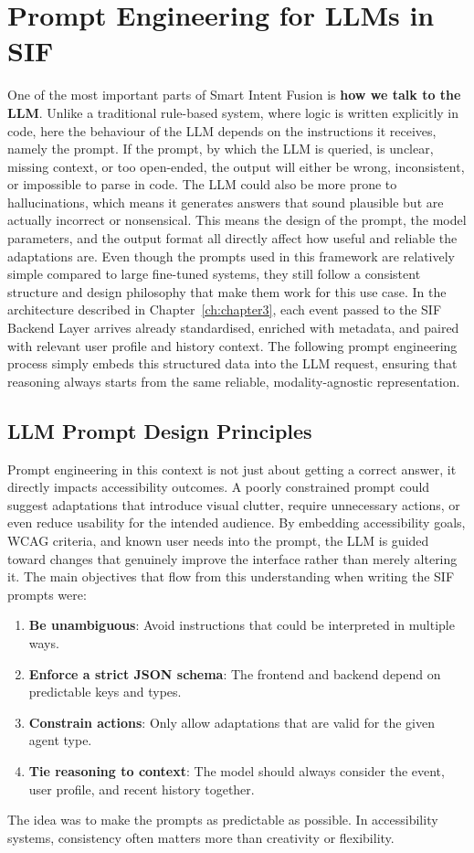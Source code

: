 \documentclass[openany]{book}
\begin{document}
\section{Prompt Engineering for LLMs in SIF}
One of the most important parts of Smart Intent Fusion is \textbf{how we talk to the LLM}.
Unlike a traditional rule-based system, where logic is written explicitly in code, here the behaviour of the LLM depends on the instructions it receives, namely the prompt.
If the prompt, by which the LLM is queried, is unclear, missing context, or too open-ended, the output will either be wrong, inconsistent, or impossible to parse in code.
The LLM could also be more prone to hallucinations, which means it generates answers that sound plausible but are actually incorrect or nonsensical. This means the design of the prompt, the model parameters, and the output format all directly affect how useful and reliable the adaptations are. Even though the prompts used in this framework are relatively simple compared to large fine-tuned systems, they still follow a consistent structure and design philosophy that make them work for this use case. In the architecture described in Chapter~\ref{ch:chapter3}, each event passed to the SIF Backend Layer arrives already standardised, enriched with metadata, and paired with relevant user profile and history context. The following prompt engineering process simply embeds this structured data into the LLM request, ensuring that reasoning always starts from the same reliable, modality-agnostic representation.

\subsection{LLM Prompt Design Principles}
Prompt engineering in this context is not just about getting a correct answer, it directly impacts accessibility outcomes. A poorly constrained prompt could suggest adaptations that introduce visual clutter, require unnecessary actions, or even reduce usability for the intended audience. By embedding accessibility goals, WCAG criteria, and known user needs into the prompt, the LLM is guided toward changes that genuinely improve the interface rather than merely altering it.
The main objectives that flow from this understanding when writing the SIF prompts were:
\begin{enumerate}
    \item \textbf{Be unambiguous}: Avoid instructions that could be interpreted in multiple ways.
    \item \textbf{Enforce a strict JSON schema}: The frontend and backend depend on predictable keys and types.
    \item \textbf{Constrain actions}: Only allow adaptations that are valid for the given agent type.
    \item \textbf{Tie reasoning to context}: The model should always consider the event, user profile, and recent history together.
\end{enumerate}
The idea was to make the prompts as predictable as possible. In accessibility systems, consistency often matters more than creativity or flexibility.
\end{document}
